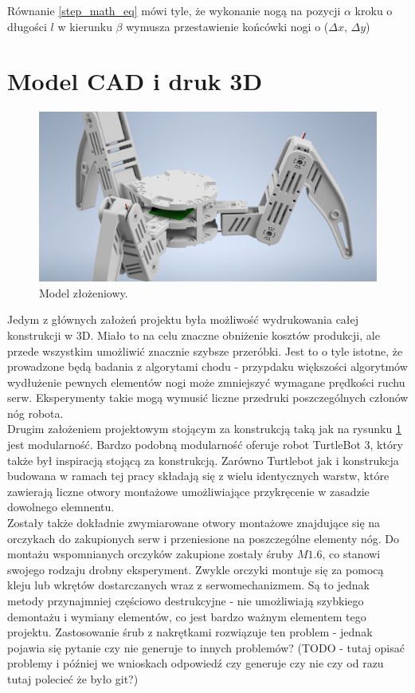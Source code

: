 \documentclass[a4paper,13pt]{article}
\begin{document}
Równanie \ref{step_math_eq} mówi tyle, że wykonanie nogą na pozycji $\alpha$ kroku o długości $l$ w kierunku $\beta$ wymusza przestawienie końcówki nogi o ($\Delta x$, $\Delta y$)



\section{Model CAD i druk 3D}
\begin{figure}[H]
\includegraphics[width=\textwidth]{img/CAD_assembly.png}
\caption{Model złożeniowy.}
\label{CAD_assembly}
\end{figure}
Jedym z głównych założeń projektu była możliwość wydrukowania całej konstrukcji w 3D. Miało to na celu znaczne obniżenie kosztów produkcji, ale przede wszystkim umożliwić znacznie szybsze przeróbki. Jest to o tyle istotne, że prowadzone będą badania z algorytami chodu - przypdaku większości algorytmów wydłużenie pewnych elementów nogi może zmniejszyć wymagane prędkości ruchu serw. Eksperymenty takie mogą wymusić liczne przedruki poszczególnych członów nóg robota.\\

Drugim założeniem projektowym stojącym za konstrukcją taką jak na rysunku \ref{CAD_assembly} jest modularność. Bardzo podobną modularność oferuje robot TurtleBot 3, który także był inspiracją stojącą za konstrukcją. Zarówno Turtlebot jak i konstrukcja budowana w ramach tej pracy składają się z wielu identycznych warstw, które zawierają liczne otwory montażowe umożliwiające przykręcenie w zasadzie dowolnego elemnentu.\\

Zostały także dokładnie zwymiarowane otwory montażowe znajdujące się na orczykach do zakupionych serw i przeniesione na poszczególne elementy nóg. Do montażu wspomnianych orczyków zakupione zostały śruby $M1.6$, co stanowi swojego rodzaju drobny eksperyment. Zwykle orczyki montuje się za pomocą kleju lub wkrętów dostarczanych wraz z serwomechanizmem. Są to jednak metody przynajmniej częściowo destrukcyjne - nie umożliwiają szybkiego demontażu i wymiany elementów, co jest bardzo ważnym elementem tego projektu. Zastosowanie śrub z nakrętkami rozwiązuje ten problem - jednak pojawia się pytanie czy nie generuje to innych problemów? (TODO - tutaj opisać problemy i później we wnioskach odpowiedź czy generuje czy nie czy od razu tutaj polecieć że było git?)\\
\end{document}
